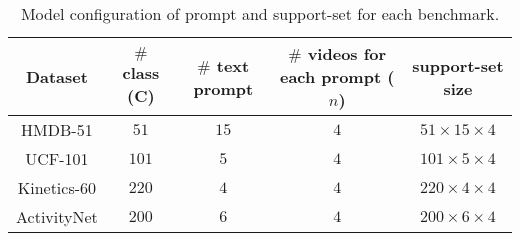 \begin{table*}[!t]
    \centering
    \begin{tabular}{ccccc}
        \toprule[1pt]
        \textbf{Dataset}      & \textbf{$\#$ class (C)}      & \textbf{$\#$ text prompt} & \textbf{$\#$ videos for each prompt ($n$)} & \textbf{support-set size}\\ 
        \hline
        HMDB-51     & $51$      & $15$  & $4$    & $51 \times 15 \times 4$\\
        UCF-101     & $101$     & $5$   & $4$    & $101 \times 5 \times 4$\\
        Kinetics-60 & $220$         & $4$   & $4$    & $220 \times 4 \times 4$\\
        ActivityNet & $200$       & $6$   & $4$    & $200 \times 6 \times 4$\\
        \bottomrule[1pt]
    \end{tabular}
    \caption{Model configuration of prompt and support-set for each benchmark.}
    \label{tab::model_config}
\end{table*}